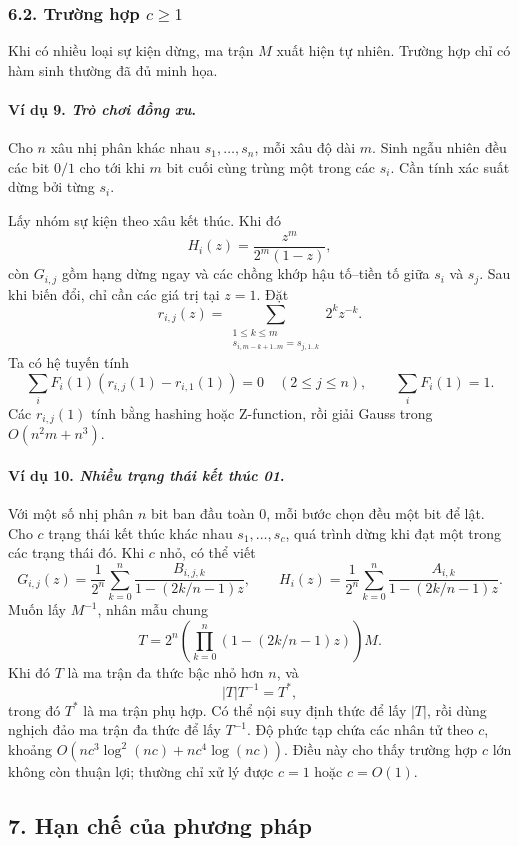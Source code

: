 \documentclass[11pt]{article}
\begin{document}
\subsubsection*{6.2. Trường hợp \(c\ge 1\)}

Khi có nhiều loại sự kiện dừng, ma trận \(M\) xuất hiện tự nhiên. Trường hợp
chỉ có hàm sinh thường đã đủ minh họa.

\paragraph{Ví dụ 9. \emph{Trò chơi đồng xu}.}
Cho \(n\) xâu nhị phân khác nhau \(s_1,\ldots,s_n\), mỗi xâu độ dài \(m\). Sinh
ngẫu nhiên đều các bit \(0/1\) cho tới khi \(m\) bit cuối cùng trùng một trong
các \(s_i\). Cần tính xác suất dừng bởi từng \(s_i\).

Lấy nhóm sự kiện theo xâu kết thúc. Khi đó
\[
  H_i(z)=\frac{z^m}{2^m(1-z)},
\]
còn \(G_{i,j}\) gồm hạng dừng ngay và các chồng khớp hậu tố--tiền tố giữa
\(s_i\) và \(s_j\). Sau khi biến đổi, chỉ cần các giá trị tại \(z=1\). Đặt
\[
  r_{i,j}(z)=
  \sum_{\substack{1\le k\le m\\s_{i,m-k+1..m}=s_{j,1..k}}}2^kz^{-k}.
\]
Ta có hệ tuyến tính
\[
  \sum_i F_i(1)(r_{i,j}(1)-r_{i,1}(1))=0\quad (2\le j\le n),
  \qquad
  \sum_i F_i(1)=1.
\]
Các \(r_{i,j}(1)\) tính bằng hashing hoặc Z-function, rồi giải Gauss trong
\(O(n^2m+n^3)\).

\paragraph{Ví dụ 10. \emph{Nhiều trạng thái kết thúc 01}.}
Với một số nhị phân \(n\) bit ban đầu toàn \(0\), mỗi bước chọn đều một bit để
lật. Cho \(c\) trạng thái kết thúc khác nhau \(s_1,\ldots,s_c\), quá trình dừng
khi đạt một trong các trạng thái đó. Khi \(c\) nhỏ, có thể viết
\[
  G_{i,j}(z)=\frac1{2^n}\sum_{k=0}^n\frac{B_{i,j,k}}
  {1-(2k/n-1)z},
  \qquad
  H_i(z)=\frac1{2^n}\sum_{k=0}^n\frac{A_{i,k}}
  {1-(2k/n-1)z}.
\]
Muốn lấy \(M^{-1}\), nhân mẫu chung
\[
  T=2^n\left(\prod_{k=0}^n(1-(2k/n-1)z)\right)M.
\]
Khi đó \(T\) là ma trận đa thức bậc nhỏ hơn \(n\), và
\[
  |T|T^{-1}=T^*,
\]
trong đó \(T^*\) là ma trận phụ hợp. Có thể nội suy định thức để lấy \(|T|\),
rồi dùng nghịch đảo ma trận đa thức để lấy \(T^{-1}\). Độ phức tạp chứa các
nhân tử theo \(c\), khoảng \(O(nc^3\log^2(nc)+nc^4\log(nc))\). Điều này cho
thấy trường hợp \(c\) lớn không còn thuận lợi; thường chỉ xử lý được \(c=1\)
hoặc \(c=O(1)\).

\subsection*{7. Hạn chế của phương pháp}
\end{document}
